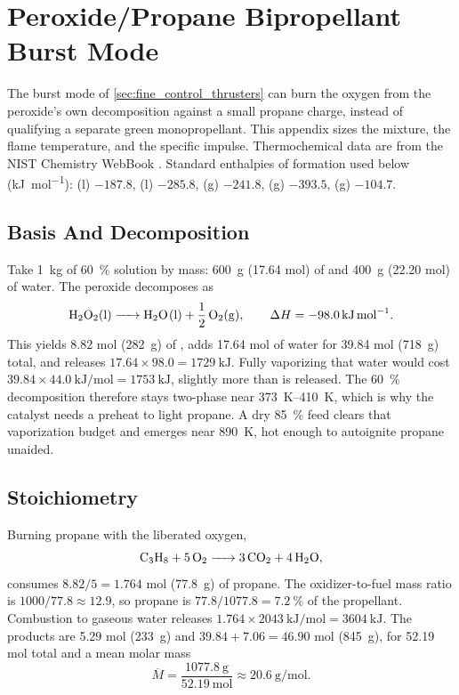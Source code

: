 \documentclass{article}
\begin{document}


\section{Peroxide/Propane Bipropellant Burst Mode}\label{sec:peroxide_propane_biprop}

The burst mode of \autoref{sec:fine_control_thrusters} can burn the oxygen from the peroxide's own decomposition against a small propane charge, instead of qualifying a separate green monopropellant. This appendix sizes the mixture, the flame temperature, and the specific impulse. Thermochemical data are from the NIST Chemistry WebBook \cite{nist_webbook_propane,nist_webbook_oxygen,nist_webbook_hydrogen}. Standard enthalpies of formation used below (\si{\kilo\joule\per\mole}): (l) \(-187.8\), (l) \(-285.8\), (g) \(-241.8\), (g) \(-393.5\), (g) \(-104.7\).

\subsection*{Basis And Decomposition}
Take \SI{1}{\kilo\gram} of \SI{60}{\percent} solution by mass: \SI{600}{\g} (\num{17.64} mol) of  and \SI{400}{\g} (\num{22.20} mol) of water. The peroxide decomposes as
\[
\ce{H2O2(l) -> H2O(l) + 1/2 O2(g)}, \qquad \Delta H = \SI{-98.0}{\kilo\joule\per\mole}.
\]
This yields \num{8.82} mol (\SI{282}{\g}) of , adds \num{17.64} mol of water for \num{39.84} mol (\SI{718}{\g}) total, and releases \(17.64\times 98.0 = \SI{1729}{\kilo\joule}\). Fully vaporizing that water would cost \(39.84\times\SI{44.0}{\kilo\joule\per\mole}=\SI{1753}{\kilo\joule}\), slightly more than is released. The \SI{60}{\percent} decomposition therefore stays two-phase near \SIrange{373}{410}{\kelvin}, which is why the catalyst needs a preheat to light propane. A dry \SI{85}{\percent} feed clears that vaporization budget and emerges near \SI{890}{\kelvin}, hot enough to autoignite propane unaided.

\subsection*{Stoichiometry}
Burning propane with the liberated oxygen,
\[
\ce{C3H8 + 5 O2 -> 3 CO2 + 4 H2O},
\]
consumes \(8.82/5 = \num{1.764}\) mol (\SI{77.8}{\g}) of propane. The oxidizer-to-fuel mass ratio is \(1000/77.8 \approx \num{12.9}\), so propane is \(77.8/1077.8 = \SI{7.2}{\percent}\) of the propellant. Combustion to gaseous water releases \(1.764\times\SI{2043}{\kilo\joule\per\mole} = \SI{3604}{\kilo\joule}\). The products are \num{5.29} mol  (\SI{233}{\g}) and \(39.84+7.06 = \num{46.90}\) mol  (\SI{845}{\g}), for \num{52.19} mol total and a mean molar mass
\[
\overline{M} = \frac{\SI{1077.8}{\g}}{\num{52.19}\ \mathrm{mol}} \approx \SI{20.6}{\g\per\mole}.
\]
\end{document}
